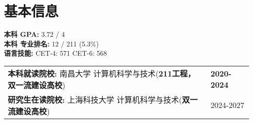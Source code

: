 \documentclass{resume}
\begin{document}









\section{基本信息}
\textbf{本科 GPA: } 3.72 / 4 \\
\textbf{本科 专业排名: } 12 / 211 (5.3\%)  \\
\textbf{语言技能: } CET-4: 571 \quad CET-6: 568 \\
\begin{tabular}{@{}p{}p{}@{}}
  \textbf{本科就读院校: } 南昌大学 计算机科学与技术(\textbf{211工程， 双一流建设高校}) & \hfill \textbf{2020-2024} \\
  \textbf{研究生在读院校: } 上海科技大学 计算机科学与技术(\textbf{双一流建设高校}) & \hfill 2024-2027
\end{tabular}
\end{document}
